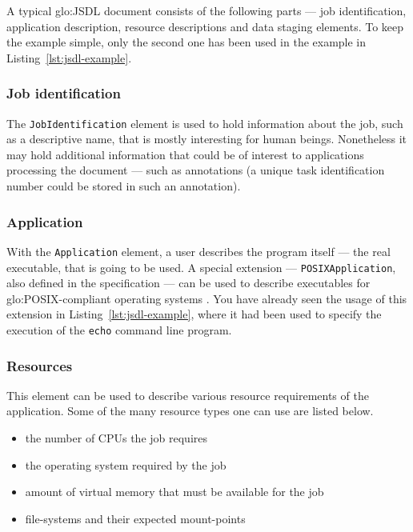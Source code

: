 A typical \gls{glo:JSDL} document consists  of the following parts --- job
identification,  application description,  resource descriptions  and data
staging elements. To keep the example simple, only the second one has been
used in the example  in Listing~\ref{lst:jsdl-example}.

\subsubsection{Job identification}

The \texttt{JobIdentification}  element is used to  hold information about
the job, such as a descriptive  name, that is mostly interesting for human
beings.  Nonetheless it  may hold additional information that  could be of
interest to  applications processing the document ---  such as annotations
(\eg a  unique task  identification number  could  be stored  in such  an
annotation).

\subsubsection{Application}

With the \texttt{Application} element, a user describes the program itself
---  \ie the  real executable,  that  is going  to  be  used.  A  special
extension --- \texttt{POSIXApplication}, also defined in the specification
\cite{jsdl-spec}   ---   can  be   used   to   describe  executables   for
\gls{glo:POSIX}-compliant   operating  systems  \cite{posix}.    You  have
already      seen     the     usage      of     this      extension     in
Listing~\ref{lst:jsdl-example},  where it  had  been used  to specify  the
execution of the \texttt{echo} command line program.

\subsubsection{Resources}

This element can be used  to describe various resource requirements of the
application. Some of the many resource types one can use are listed below.

\begin{itemize}
\item the number of CPUs the job requires
\item the operating system required by the job
\item amount of virtual memory that must be available for the job
\item file-systems  and their expected  mount-points
\end{itemize}

